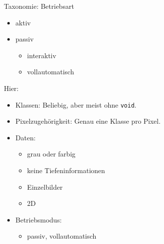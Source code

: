 \begin{frame}{Taxonomie: Betriebsart}
    \begin{itemize}
        \item aktiv
        \item passiv
        \begin{itemize}
            \item interaktiv
            \item vollautomatisch
        \end{itemize}
    \end{itemize}
\end{frame}

\begin{frame}{Hier:}
    \begin{itemize}
        \item Klassen: Beliebig, aber meist ohne \texttt{void}.
        \item Pixelzugehörigkeit: Genau eine Klasse pro Pixel.
        \item Daten:
        \begin{itemize}
            \item grau oder farbig
            \item keine Tiefeninformationen
            \item Einzelbilder
            \item 2D
        \end{itemize}
        \item Betriebsmodus:
        \begin{itemize}
            \item passiv, vollautomatisch
        \end{itemize}
    \end{itemize}
\end{frame}
